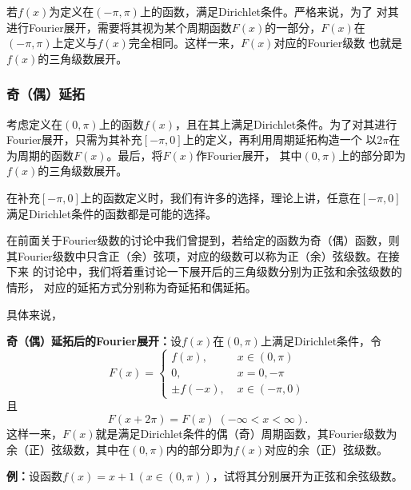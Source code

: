 若$f(x)$为定义在$(-\pi,\pi)$上的函数，满足Dirichlet条件。严格来说，为了
对其进行Fourier展开，需要将其视为某个周期函数$F(x)$的一部分，$F(x)$在
$(-\pi,\pi)$上定义与$f(x)$完全相同。这样一来，$F(x)$对应的Fourier级数
也就是$f(x)$的三角级数展开。

\subsubsection{奇（偶）延拓}

考虑定义在$(0,\pi)$上的函数$f(x)$，且在其上满足Dirichlet条件。为了对其进行
Fourier展开，只需为其补充$[-\pi,0]$上的定义，再利用周期延拓构造一个
以$2\pi$在为周期的函数$F(x)$。最后，将$F(x)$作Fourier展开，
其中$(0,\pi)$上的部分即为$f(x)$的三角级数展开。

在补充$[-\pi,0]$上的函数定义时，我们有许多的选择，理论上讲，任意在$[-\pi,0]$
满足Dirichlet条件的函数都是可能的选择。

在前面关于Fourier级数的讨论中我们曾提到，若给定的函数为奇（偶）函数，则
其Fourier级数中只含正（余）弦项，对应的级数可以称为正（余）弦级数。在接下来
的讨论中，我们将着重讨论一下展开后的三角级数分别为正弦和余弦级数的情形，
对应的延拓方式分别称为奇延拓和偶延拓。

具体来说，

\begin{thx}
	{\bf 奇（偶）延拓后的Fourier展开：}设$f(x)$在$(0,\pi)$上满足Dirichlet条件，令
	$$F(x)=\left\{\begin{array}{ll}
	  	f(x),\;& x\in(0,\pi)\\
	  	0,\;& x=0,-\pi\\
	  	\pm f(-x),\;& x\in(-\pi,0)
	  \end{array}\right.$$
	且
	  $$F(x+2\pi)=F(x)\;(-\infty<x<\infty).$$
	这样一来，$F(x)$就是满足Dirichlet条件的偶（奇）周期函数，其Fourier级数为
	余（正）弦级数，其中在$(0,\pi)$内的部分即为$f(x)$对应的余（正）弦级数。
\end{thx}

{\bf 例：}设函数$f(x)=x+1\,(x\in(0,\pi))$，试将其分别展开为正弦和余弦级数。

\begin{center}
	
\end{center}

